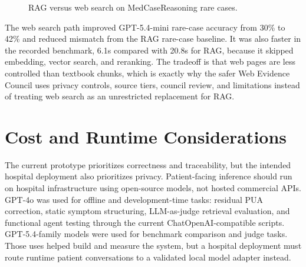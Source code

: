 \begin{figure}[htbp]
\centering
{}
\caption{RAG versus web search on MedCaseReasoning rare cases.}
\label{fig:rag_vs_web_search}
\end{figure}

The web search path improved GPT-5.4-mini rare-case accuracy from 30\% to 42\% and reduced mismatch from the RAG rare-case baseline. It was also faster in the recorded benchmark, 6.1s compared with 20.8s for RAG, because it skipped embedding, vector search, and reranking. The tradeoff is that web pages are less controlled than textbook chunks, which is exactly why the safer Web Evidence Council uses privacy controls, source tiers, council review, and limitations instead of treating web search as an unrestricted replacement for RAG.

\section{Cost and Runtime Considerations}

The current prototype prioritizes correctness and traceability, but the intended hospital deployment also prioritizes privacy. Patient-facing inference should run on hospital infrastructure using open-source models, not hosted commercial APIs. GPT-4o was used for offline and development-time tasks: residual PUA correction, static symptom structuring, LLM-as-judge retrieval evaluation, and functional agent testing through the current ChatOpenAI-compatible scripts. GPT-5.4-family models were used for benchmark comparison and judge tasks. Those uses helped build and measure the system, but a hospital deployment must route runtime patient conversations to a validated local model adapter instead.

